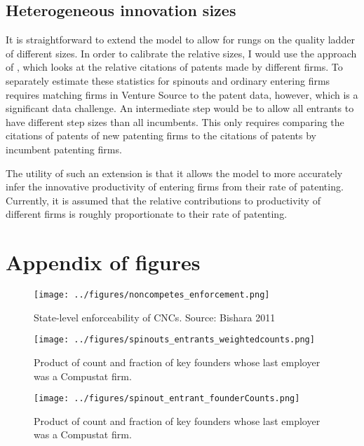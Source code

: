 \documentclass[12pt,english]{article}
\theoremstyle{remark}
\begin{document}
\subsection{Heterogeneous innovation sizes}

It is straightforward to extend the model to allow for rungs on the quality ladder of different sizes. In order to calibrate the relative sizes, I would use the approach of \cite{akcigit_growth_2018}, which looks at the relative citations of patents made by different firms. To separately estimate these statistics for spinouts and ordinary entering firms requires matching firms in Venture Source to the patent data, however, which is a significant data challenge. An intermediate step would be to allow all entrants to have different step sizes than all incumbents. This only requires comparing the citations of patents of new patenting firms to the citations of patents by incumbent patenting firms. 

The utility of such an extension is that it allows the model to more accurately infer the innovative productivity of entering firms from their rate of patenting. Currently, it is assumed that the relative contributions to productivity of different firms is roughly proportionate to their rate of patenting.




\renewcommand\thefigure{\thesection.\arabic{figure}}  
\setcounter{figure}{0}


\section{Appendix of figures}\renewcommand{\thetable}{A\arabic{table}}

\begin{figure}	
	\center
	\caption{State-level enforceability of CNCs. Source: Bishara 2011}
	\texttt{[image: ../figures/noncompetes\_enforcement.png]}
	\label{noncompetes_enforcement}
\end{figure}

\begin{figure}[h]
	\centering
	\texttt{[image: ../figures/spinouts\_entrants\_weightedcounts.png]}
	\caption{Product of count and fraction of key founders whose last employer was a Compustat firm.}
	\label{spinout_entrants_counts_weighted}
\end{figure} 

\begin{figure}[p]
	\centering
	\texttt{[image: ../figures/spinout\_entrant\_founderCounts.png]}
	\caption{Product of count and fraction of key founders whose last employer was a Compustat firm.}
	\label{spinout_entrants_foundercounts}
\end{figure}
\end{document}
